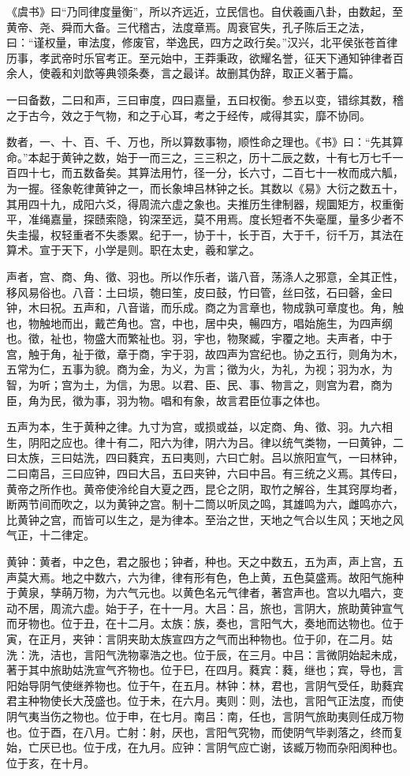 \documentclass[]{article}
\begin{document}
《虞书》曰``乃同律度量衡''，所以齐远近，立民信也。自伏羲画八卦，由数起，至黄帝、尧、舜而大备。三代稽古，法度章焉。周衰官失，孔子陈后王之法，曰：``谨权量，审法度，修废官，举逸民，四方之政行矣。''汉兴，北平侯张苍首律历事，孝武帝时乐官考正。至元始中，王莽秉政，欲耀名誉，征天下通知钟律者百余人，使羲和刘歆等典领条奏，言之最详。故删其伪辞，取正义著于篇。

一曰备数，二曰和声，三曰审度，四曰嘉量，五曰权衡。参五以变，错综其数，稽之于古今，效之于气物，和之于心耳，考之于经传，咸得其实，靡不协同。

数者，一、十、百、千、万也，所以算数事物，顺性命之理也。《书》曰：``先其算命。''本起于黄钟之数，始于一而三之，三三积之，历十二辰之数，十有七万七千一百四十七，而五数备矣。其算法用竹，径一分，长六寸，二百七十一枚而成六觚，为一握。径象乾律黄钟之一，而长象坤吕林钟之长。其数以《易》大衍之数五十，其用四十九，成阳六爻，得周流六虚之象也。夫推历生律制器，规圜矩方，权重衡平，准绳嘉量，探赜索隐，钩深至远，莫不用焉。度长短者不失毫厘，量多少者不失圭撮，权轻重者不失黍累。纪于一，协于十，长于百，大于千，衍千万，其法在算术。宣于天下，小学是则。职在太史，羲和掌之。

声者，宫、商、角、徵、羽也。所以作乐者，谐八音，荡涤人之邪意，全其正性，移风易俗也。八音：土曰埙，匏曰笙，皮曰鼓，竹曰管，丝曰弦，石曰磬，金曰钟，木曰祝。五声和，八音谐，而乐成。商之为言章也，物成孰可章度也。角，触也，物触地而出，戴芒角也。宫，中也，居中央，暢四方，唱始施生，为四声纲也。徵，祉也，物盛大而繁祉也。羽，宇也，物聚臧，宇覆之地。夫声者，中于宫，触于角，祉于徵，章于商，宇于羽，故四声为宫纪也。协之五行，则角为木，五常为仁，五事为貌。商为金，为义，为言；徵为火，为礼，为视；羽为水，为智，为听；宫为土，为信，为思。以君、臣、民、事、物言之，则宫为君，商为臣，角为民，徵为事，羽为物。唱和有象，故言君臣位事之体也。

五声为本，生于黄种之律。九寸为宫，或损或益，以定商、角、徵、羽。九六相生，阴阳之应也。律十有二，阳六为律，阴六为吕。律以统气类物，一曰黄钟，二曰太族，三曰姑洗，四曰蕤宾，五曰夷则，六曰亡射。吕以旅阳宣气，一曰林钟，二曰南吕，三曰应钟，四曰大吕，五曰夹钟，六曰中吕。有三统之义焉。其传曰，黄帝之所作也。黄帝使泠纶自大夏之西，昆仑之阴，取竹之解谷，生其窍厚均者，断两节间而吹之，以为黄钟之宫。制十二筒以听凤之鸣，其雄鸣为六，雌鸣亦六，比黄钟之宫，而皆可以生之，是为律本。至治之世，天地之气合以生风；天地之风气正，十二律定。

黄钟：黄者，中之色，君之服也；钟者，种也。天之中数五，五为声，声上宫，五声莫大焉。地之中数六，六为律，律有形有色，色上黄，五色莫盛焉。故阳气施种于黄泉，孳萌万物，为六气元也。以黄色名元气律者，著宫声也。宫以九唱六，变动不居，周流六虚。始于子，在十一月。大吕：吕，旅也，言阴大，旅助黄钟宣气而牙物也。位于丑，在十二月。太族：族，奏也，言阳气大，奏地而达物也。位于寅，在正月，夹钟：言阴夹助太族宣四方之气而出种物也。位于卯，在二月。姑洗：洗，洁也，言阳气洗物辜浩之也。位于辰，在三月。中吕：言微阴始起未成，著于其中旅助姑洗宣气齐物也。位于巳，在四月。蕤宾：蕤，继也；宾，导也，言阳始导阴气使继养物也。位于午，在五月。林钟：林，君也，言阴气受任，助蕤宾君主种物使长大茂盛也。位于未，在六月。夷则：则，法也，言阳气正法度，而使阴气夷当伤之物也。位于申，在七月。南吕：南，任也，言阴气旅助夷则任成万物也。位于酉，在八月。亡射：射，厌也，言阳气究物，而使阴气毕剥落之，终而复始，亡厌已也。位于戌，在九月。应钟：言阴气应亡谢，该臧万物而杂阳阂种也。位于亥，在十月。
\end{document}
